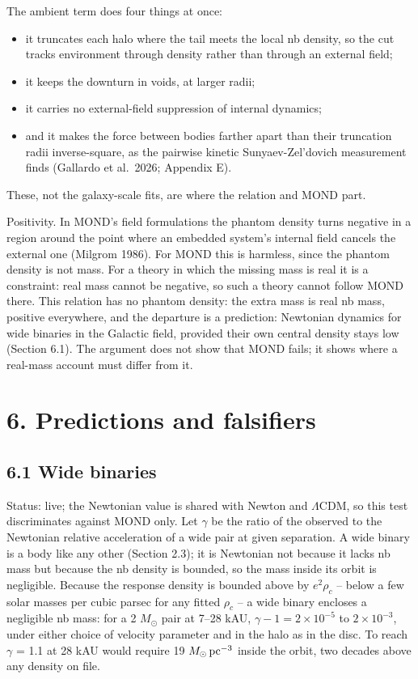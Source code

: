 \documentclass[
  10pt,
]{article}
\begin{document}
The ambient term does four things at once:
\begin{itemize}
\item it truncates each halo where the tail meets the local nb density, so the cut tracks environment through density rather than through an external field;
\item it keeps the downturn in voids, at larger radii;
\item it carries no external-field suppression of internal dynamics;
\item and it makes the force between bodies farther apart than their truncation radii inverse-square, as the pairwise kinetic Sunyaev-Zel'dovich measurement finds (Gallardo et al.~2026; Appendix E).
\end{itemize}
These, not the galaxy-scale fits, are where the
relation and MOND part.

Positivity. In MOND's field formulations the phantom density turns
negative in a region around the point where an embedded system's internal
field cancels the external one (Milgrom 1986). For MOND this is harmless,
since the phantom density is not mass. For a theory in which the missing
mass is real it is a constraint: real mass cannot be negative, so such a
theory cannot follow MOND there. This relation has no phantom density: the extra mass is real nb mass, positive everywhere, and the departure is a prediction: Newtonian dynamics for wide
binaries in the Galactic field, provided their own central density stays
low (Section 6.1). The argument does not show that
MOND fails; it shows where a real-mass account must differ from it.

\section{6. Predictions and falsifiers}\label{predictions-and-falsifiers}

\subsection{6.1 Wide binaries}

Status: live; the Newtonian value is shared with Newton and $\Lambda$CDM, so this test discriminates against MOND only. Let $\gamma$ be the ratio of the observed to the Newtonian relative acceleration of a wide pair at given separation. A wide binary is a body like any other (Section 2.3); it is Newtonian not because it lacks nb mass but because the nb density is bounded, so the mass inside its orbit is negligible. Because the response density is bounded above by $e^2\rho_c$ -- below a few solar masses per cubic parsec for any fitted $\rho_c$ -- a wide binary encloses a negligible nb mass: for a 2 $M_\odot$ pair at 7--28 kAU, $\gamma-1=2\times10^{-5}$ to $2\times10^{-3}$, under either choice of velocity parameter and in the halo as in the disc. To reach $\gamma$ = 1.1 at 28 kAU would require 19 $M_\odot\,{\rm pc}^{-3}$ inside the orbit, two decades above any density on file.
\end{document}
